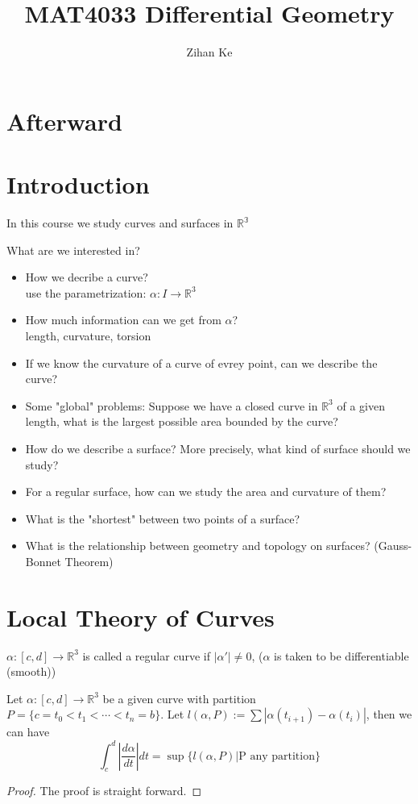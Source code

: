 \documentclass{article}
\title{MAT4033 Differential Geometry}
\author{Zihan Ke}
\begin{document}
\maketitle
\newpage
\tableofcontents
\newpage
\section*{Afterward}

\newpage
\section*{Introduction}
\noindent In this course we study curves and surfaces in $\mathbb{R^3}$

What are we interested in?
\begin{itemize}
    \item How we decribe a curve?
    \\ use the parametrization: $\alpha:I \to \mathbb{R}^3 $
    \item How much information can we get from $\alpha$?
    \\ length, curvature, torsion
    \item If we know the curvature of a curve of evrey point, can we describe the curve?
    \item Some "global" problems: Suppose we have a closed curve in $\mathbb{R}^3$ of a given length, what is the largest possible area bounded by the curve?
    \item How do we describe a surface? More precisely, what kind of surface should we study?
    \item For a regular surface, how can we study the area and curvature of them?
    \item What is the "shortest" between two points of a surface?
    \item What is the relationship between geometry and topology on surfaces? (Gauss-Bonnet Theorem)
\end{itemize}
\newpage
\section{Local Theory of Curves}
\begin{definition}
    $\alpha: [c,d]\to \mathbb{R}^3$ is called a regular curve if $|\alpha'|\neq0$, ($\alpha$ is taken to be differentiable (smooth))
\end{definition}

\begin{proposition}
    Let $\alpha:[c,d]\to \mathbb{R}^3$ be a given curve with partition $P=\{c=t_0<t_1<\cdots <t_n=b\}$. Let $l(\alpha,P):=\sum |\alpha(t_{i+1})-\alpha(t_{i})|$, then we can have \[\int_c^d |\frac{d\alpha}{dt}|dt=\operatorname{sup}\{l(\alpha,P)| \text{P any partition}\}\]
\end{proposition}
\begin{proof}
The proof is straight forward.
\end{proof}
\end{document}
